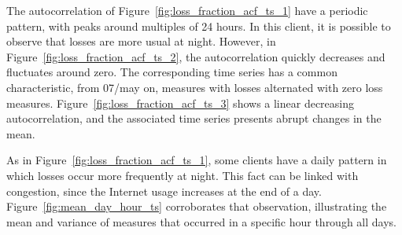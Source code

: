The autocorrelation of Figure~\ref{fig:loss_fraction_acf_ts_1} have a periodic pattern, with peaks around multiples of 24 hours. In this client, it is possible to observe that losses are more usual at night. However, in Figure~\ref{fig:loss_fraction_acf_ts_2}, the autocorrelation quickly decreases and fluctuates around zero. The corresponding time series has a common characteristic, from 07/may on, measures with losses alternated with zero loss measures. Figure~\ref{fig:loss_fraction_acf_ts_3} shows a linear decreasing autocorrelation, and the associated time series presents abrupt changes in the mean.

As in Figure~\ref{fig:loss_fraction_acf_ts_1}, some clients have a daily pattern in which losses occur more frequently at night. This fact can be linked with congestion, since the Internet usage increases at the end of a day. Figure~\ref{fig:mean_day_hour_ts} corroborates that observation, illustrating the mean and variance of measures that occurred in a specific hour through all days.

